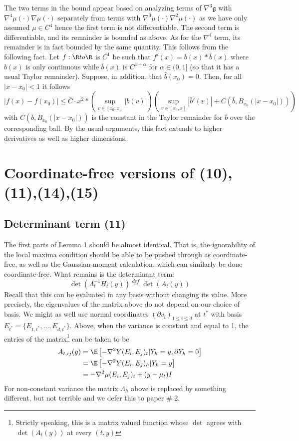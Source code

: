 \documentclass{article}
\begin{document}
The two terms in the bound appear based on analyzing terms of
$\nabla^3 \mathfrak{g}$ with $\nabla^4 \mu(\cdot) \nabla \mu(\cdot)$
separately from terms with $\nabla^3 \mu(\cdot) \nabla^2 \mu(\cdot)$
as we have only assumed $\mu \in C^{4}$ hence the first term is not
differentiable. The second term is differentiable, and its remainder
is bounded as above.  As for the $\nabla^4$ term, its remainder is in
fact bounded by the same quantity. This follows from the following
fact. Let $f: \R to \R$ is $C^1$ be such that $f'(x) = b(x) *
\bar{b}(x)$ where $b(x)$ is only continuous while $\bar{b}(x)$ is
$C^{1+\alpha}$ for $\alpha \in (0,1]$ (so that it has a usual Taylor
  remainder). Suppose, in addition, that $\bar{b}(x_0)=0$. Then, for
  all $|x-x_0|<1$ it follows
  $$
  \left|  f(x) - f(x_0) \right| \leq  \bar{C} \cdot x^2 * \left(\sup_{v \in [x_0,x]} | b(v)| \right)
  \left(\sup_{v \in [x_0, x]} |\bar{b}'(v)| + C(\bar{b}, B_{x_0}(|x-x_0|))\right)
  $$
with $C(\bar{b}, B_{x_0}(|x-x_0|))$ is the constant in the Taylor remainder for $\bar{b}$ over the corresponding ball.
By the usual arguments, this fact extends to higher derivatives as well as higher dimensions.


\section{Coordinate-free versions of (10),(11),(14),(15)}

\subsection{Determinant term (11)}

The first parts of Lemma 1 should be almost identical. That is, the ignorability
of the local maxima condition should be able to be pushed through as coordinate-free,
as well as the Gaussian moment calculation, which can similarly be done coordinate-free. What remains is the determinant term:
$$
\det(\Lambda_t^{-1} H_t(y)) \overset{def}{=} \det(A_t(y))
$$
Recall that this can be evaluated in any basis without changing its value. More precisely, the eigenvalues
of the matrix above do not depend on our choice of basis.
We might as well use normal coordinates $(\partial v_i)_{1 \leq i \leq d}$ at $t^*$ with basis $E_{t^*}=\{E_{1,t^*}, \dots, E_{d,t^*}\}$.
Above, when the variance is constant and equal to 1, the entries of the matrix\footnote{Strictly speaking, this is a matrix valued function whose $\det$ agrees with $\det(A_t(y))$ at every $(t,y)$} can be taken to be
$$
\begin{aligned}
A_{t,ij}(y) &= \E \left[-\nabla^2 Y(E_i, E_j)_t | Y_h=y, \partial Y_h=0\right] \\
&= \E \left[-\nabla^2 Y(E_i, E_j)_h | Y_h=y\right] \\
&= - \nabla^2 \mu(E_i, E_j)_t + (y - \mu_t) I \\
\end{aligned}
$$
For non-constant variance the matrix $\Lambda_h$ above is replaced by something different, but not terrible and we defer this to paper \# 2.
\end{document}
